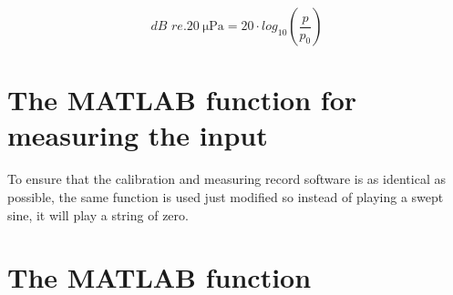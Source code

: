\begin{equation}
dB\,\, re. \SI{20}{\micro\pascal} = 20 \cdot log_{10} \left ( \frac{p}{p_0} \right )
\end{equation}

    \startexplain
    \stopexplain  


\section*{The MATLAB function for measuring the input}
To ensure that the calibration and measuring record software is as identical as possible, the same function is used just modified so instead of playing a swept sine, it will play a string of zero.

\section*{The MATLAB function}




